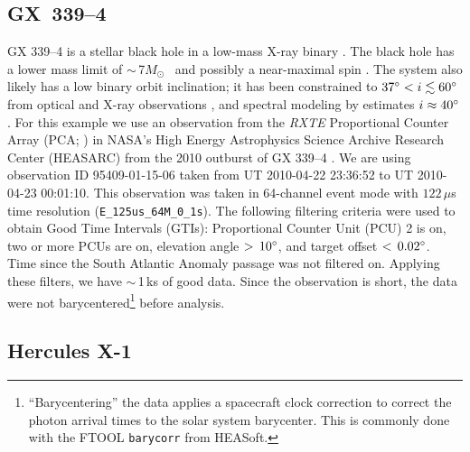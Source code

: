 \documentclass[twocolumn]{aastex62}
\newcommand{\Msun}{\ensuremath{M_\odot}\xspace}
\begin{document}
\subsection{GX~339--4}
\label{sec:gx339}
GX 339--4 is a stellar black hole in a low-mass X-ray binary \citep{Hynesetal03}. 
The black hole has a lower mass limit of $\sim$\,7\Msun\ \citep{MunozDariasetal08} and possibly a near-maximal spin \citep{Ludlametal15}. 
The system also likely has a low binary orbit inclination; it has been constrained to $37 \degree <i\lesssim 60\degree$ from optical and X-ray observations \citep{Heidaetal17, Zdziarskietal98}, and spectral modeling by \citet{WangJietal18} estimates $i\approx 40\degree$.
For this example we use an observation from the  \textit{RXTE} Proportional Counter Array (PCA; \citealt{Jahodaetal96}) in NASA's High Energy Astrophysics Science Archive Research Center (HEASARC) from the 2010 outburst of GX 339--4 \citep{Yamaokaetal10}.
We are using observation ID 95409-01-15-06 taken from UT 2010-04-22 23:36:52 to UT 2010-04-23 00:01:10.
This observation was taken in 64-channel event mode with $122\,\mu$s time resolution (\texttt{E\_125us\_64M\_0\_1s}).
The following filtering criteria were used to obtain Good Time Intervals (GTIs): Proportional Counter Unit (PCU) 2 is on, two or more PCUs are on, elevation angle $>\,10\degree$, and target offset $<\,0.02\degree$. 
Time since the South Atlantic Anomaly passage was not filtered on. 
Applying these filters, we have $\sim$\,1\,ks of good data. 
Since the observation is short, the data were not barycentered\footnote{\label{foot:bary} ``Barycentering'' the data applies a spacecraft clock correction to correct the photon arrival times to the solar system barycenter. This is commonly done with the FTOOL \texttt{barycorr} from HEASoft.} before analysis.

\subsection{Hercules X-1}
\label{sec:herx1}
\end{document}
